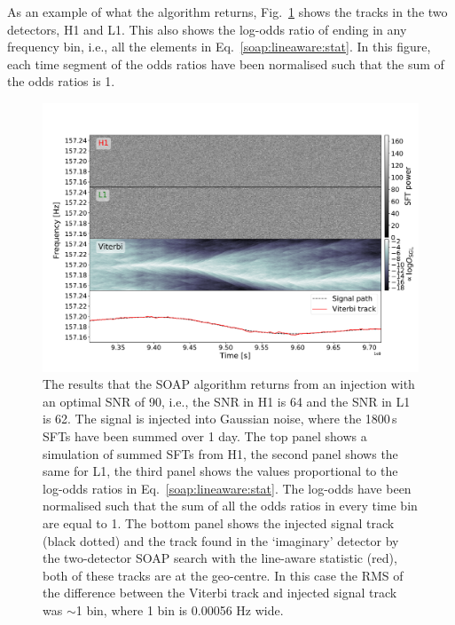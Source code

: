 %
%
As an example of what the algorithm returns, Fig.~\ref{soap:tracks} shows
the tracks in the two detectors, H1 and L1. This also shows the
log-odds ratio of ending in any
frequency bin, i.e., all the elements in Eq.~\ref{soap:lineaware:stat}.  In this figure, each time segment of the odds ratios have been normalised such that the sum of the odds ratios is 1.



\begin{figure}
\includegraphics[scale=0.45]{C3_soap/viterbi_tracks.pdf}
%
\caption[Example of SOAP algorithms and outputs when run on H1 and L1 spectrograms.]{\label{soap:tracks} The results that the SOAP algorithm returns from an injection with an optimal
\gls{SNR} of 90, i.e., the \gls{SNR} in H1 is 64 and the \gls{SNR} in L1 is 62.
The signal is injected into Gaussian noise, where the 1800\,s \glspl{SFT} have been
summed over 1 day.  The top panel shows a simulation of summed \glspl{SFT} from H1, the second panel shows the same for L1,
the third panel shows the values proportional to the
log-odds ratios in Eq.~\ref{soap:lineaware:stat}.
The log-odds have been normalised such that the sum of
all the odds ratios in every time bin are equal to 1. The bottom panel shows the injected signal track (black dotted) and the track found in the `imaginary' detector by the two-detector SOAP search with the line-aware statistic (red), both of these tracks are at the geo-centre. In this case the \gls{RMS} of the difference between the Viterbi track and injected signal track was $\sim$1 bin, where 1 bin is 0.00056 Hz wide.}
%
\end{figure}



